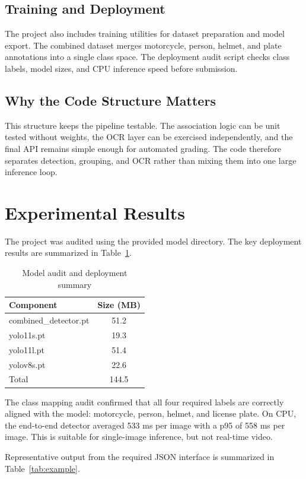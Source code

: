 \documentclass[conference]{IEEEtran}
\begin{document}
\subsection{Training and Deployment}
The project also includes training utilities for dataset preparation and model export. The combined dataset merges motorcycle, person, helmet, and plate annotations into a single class space. The deployment audit script checks class labels, model sizes, and CPU inference speed before submission.

\subsection{Why the Code Structure Matters}
This structure keeps the pipeline testable. The association logic can be unit tested without weights, the OCR layer can be exercised independently, and the final API remains simple enough for automated grading. The code therefore separates detection, grouping, and OCR rather than mixing them into one large inference loop.

\section{Experimental Results}
The project was audited using the provided model directory. The key deployment results are summarized in Table~\ref{tab:audit}.

\begin{table}[t]
\centering
\caption{Model audit and deployment summary}
\label{tab:audit}
\small
\begin{tabular}{lc}
\toprule
Component & Size (MB) \\
\midrule
combined\_detector.pt & 51.2 \\
yolo11s.pt & 19.3 \\
yolo11l.pt & 51.4 \\
yolov8s.pt & 22.6 \\
\midrule
Total & 144.5 \\
\bottomrule
\end{tabular}
\end{table}

The class mapping audit confirmed that all four required labels are correctly aligned with the model: motorcycle, person, helmet, and license plate. On CPU, the end-to-end detector averaged 533 ms per image with a p95 of 558 ms per image. This is suitable for single-image inference, but not real-time video.

Representative output from the required JSON interface is summarized in Table~\ref{tab:example}.
\end{document}
